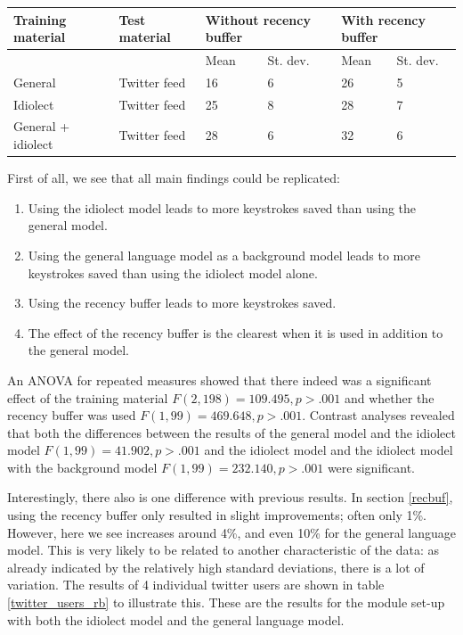 \documentclass[12pt]{article}
\let\originaltable\table
\let\endoriginaltable\endtable
\renewenvironment{table}[1][ht]{%
  \originaltable[#1]
  \centering}%
  {\endoriginaltable}
\begin{document}
\begin{table}[H] 
\centering
\begin{tabular}{ll|llll} 
Training material&Test material&\multicolumn{2}{l}{Without recency buffer}&\multicolumn{2}{l}{With recency buffer}\\
\hline
&&Mean&St. dev.&Mean&St. dev.\\
General&Twitter feed&16&6&26&5\\
Idiolect&Twitter feed&25&8&28&7\\
General + idiolect&Twitter feed&28&6&32&6\\
\end{tabular} 
\caption{Mean percentage of keystrokes saved (\textbf{SKKS}) and standard deviations for all module set-ups.} \label{twitter_results_skks}
\end{table}

First of all, we see that all main findings could be replicated: 

\begin{enumerate}
\item Using the idiolect model leads to more keystrokes saved than using the general model.
\item Using the general language model as a background model leads to more keystrokes saved than using the idiolect model alone.
\item Using the recency buffer leads to more keystrokes saved.
\item The effect of the recency buffer is the clearest when it is used in addition to the general model.
\end{enumerate}

An ANOVA for repeated measures showed that there indeed was a significant effect of the training material $F(2,198) = 109.495, p > .001$ and whether the recency buffer was used $F(1,99) = 469.648, p > .001$. Contrast analyses revealed that both the differences between the results of the general model and the idiolect model $F(1,99) = 41.902, p > .001$ and the idiolect model and the idiolect model with the background model $F(1,99) = 232.140, p > .001$ were significant.

Interestingly, there also is one difference with previous results. In section \ref{recbuf}, using the recency buffer only resulted in slight improvements; often only 1\%. However, here we see increases around 4\%, and even 10\% for the general language model. This is very likely to be related to another characteristic of the data: as already indicated by the relatively high standard deviations, there is a lot of variation. The results of 4 individual twitter users are shown in table \ref{twitter_users_rb} to illustrate this. These are the results for the module set-up with both the idiolect model and the general language model.
\end{document}
